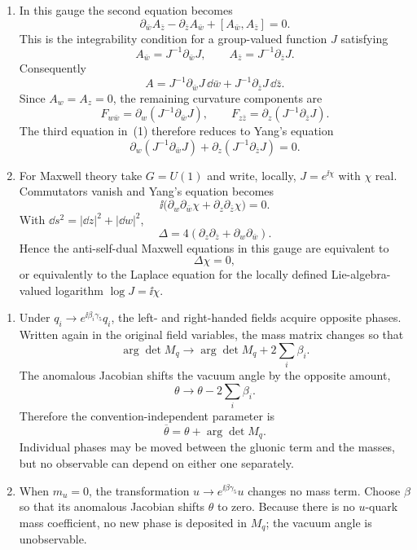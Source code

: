 \begin{enumerate}
\begin{enumerate}
    \item[(iv)]
    In this gauge the second equation becomes
    \[
      \partial_{\bar w}A_{\bar z}
       -\partial_{\bar z}A_{\bar w}
       +[A_{\bar w},A_{\bar z}]=0.
    \]
    This is the integrability condition for a group-valued function
    \(J\) satisfying
    \[
      A_{\bar w}=J^{-1}\partial_{\bar w}J,
      \qquad
      A_{\bar z}=J^{-1}\partial_{\bar z}J.
    \]
    Consequently
    \[
      A=J^{-1}\partial_{\bar w}J\,\dd\bar w
        +J^{-1}\partial_{\bar z}J\,\dd\bar z.
    \]
    Since \(A_w=A_z=0\), the remaining curvature components are
    \[
      F_{w\bar w}=\partial_w(J^{-1}\partial_{\bar w}J),
      \qquad
      F_{z\bar z}=\partial_z(J^{-1}\partial_{\bar z}J).
    \]
    The third equation in~(1) therefore reduces to Yang's equation
    \[
      \boxed{\partial_w(J^{-1}\partial_{\bar w}J)
       +\partial_z(J^{-1}\partial_{\bar z}J)=0.}
    \]

    \item[(v)]
    For Maxwell theory take \(G=U(1)\) and write, locally,
    \(J=e^{\ii\chi}\) with \(\chi\) real.  Commutators vanish and Yang's
    equation becomes
    \[
      \ii\bigl(\partial_w\partial_{\bar w}\chi
        +\partial_z\partial_{\bar z}\chi\bigr)=0.
    \]
    With \(\dd s^2=|\dd z|^2+|\dd w|^2\),
    \[
      \Delta=4\left(
        \partial_z\partial_{\bar z}
       +\partial_w\partial_{\bar w}\right).
    \]
    Hence the anti-self-dual Maxwell equations in this gauge are
    equivalent to
    \[
      \boxed{\Delta\chi=0,}
    \]
    or equivalently to the Laplace equation for the locally defined
    Lie-algebra-valued logarithm \(\log J=\ii\chi\).
  \end{enumerate}

  \begin{enumerate}
    \item[(a)]
    Under
    \(q_i\to e^{\ii\beta_i\gamma_5}q_i\), the left- and right-handed fields
    acquire opposite phases.  Written again in the original field
    variables, the mass matrix changes so that
    \[
      \arg\det M_q\longrightarrow
        \arg\det M_q+2\sum_i\beta_i.
    \]
    The anomalous Jacobian shifts the vacuum angle by the opposite amount,
    \[
      \theta\longrightarrow\theta-2\sum_i\beta_i.
    \]
    Therefore the convention-independent parameter is
    \[
      \boxed{\overline\theta=\theta+\arg\det M_q.}
    \]
    Individual phases may be moved between the gluonic term and the
    masses, but no observable can depend on either one separately.
    \item[(b)]
    When \(m_u=0\), the transformation
    \(u\to e^{\ii\beta\gamma_5}u\) changes no mass term.  Choose \(\beta\)
    so that its anomalous Jacobian shifts \(\theta\) to zero.  Because
    there is no \(u\)-quark mass coefficient, no new phase is deposited
    in \(M_q\); the vacuum angle is unobservable.


\end{enumerate}
\end{enumerate}

